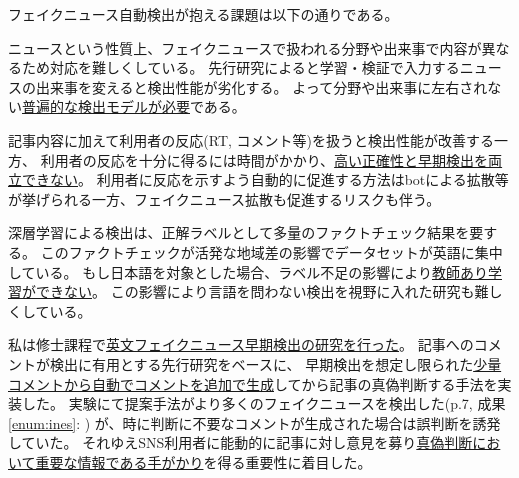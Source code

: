 フェイクニュース自動検出が抱える課題は以下の通りである。
\vspace{-3mm}
\begin{description}
    \setlength{\parskip}{0cm}
    \setlength{\itemsep}{0cm}
    \item[分野や出来事による特異性] %
        ニュースという性質上、フェイクニュースで扱われる分野や出来事で内容が異なるため対応を難しくしている。
        先行研究によると学習・検証で入力するニュースの出来事を変えると検出性能が劣化する\cite{Wang:2018:EEA:3219819.3219903}。
        よって分野や出来事に左右されない\underline{普遍的な検出モデルが必要}である。
    \item[早期検出と正確性の両立] %
        記事内容に加えて利用者の反応(RT, コメント等)を扱うと検出性能が改善する\cite{Wu:2018:TFF:3159652.3159677}一方、
        利用者の反応を十分に得るには時間がかかり、\underline{高い正確性と早期検出を両立できない}。
        利用者に反応を示すよう自動的に促進する方法はbotによる拡散等が挙げられる一方、フェイクニュース拡散も促進するリスクも伴う。
    \item[日本語データセット不足] %
        深層学習による検出は、正解ラベルとして多量のファクトチェック結果を要する。
        このファクトチェックが活発な地域差の影響でデータセットが英語に集中\cite{fakenewsnet}している。
        もし日本語を対象とした場合、ラベル不足の影響により\underline{教師あり学習ができない}。
        この影響により言語を問わない検出を視野に入れた研究も難しくしている。
    \end{description}

私は修士課程で\underline{英文フェイクニュース早期検出の研究を行った}。
記事へのコメントが検出に有用とする先行研究\cite{defend}をベースに、
早期検出を想定し限られた\underline{少量コメントから自動でコメントを追加で生成}してから記事の真偽判断する手法を実装した。
実験にて提案手法がより多くのフェイクニュースを検出した(p.7, 成果\ref{enum:ines}: \cite{ines})
が、時に判断に不要なコメントが生成された場合は誤判断を誘発していた。
それゆえSNS利用者に能動的に記事に対し意見を募り\underline{真偽判断において重要な情報である手がかり}を得る重要性に着目した。

